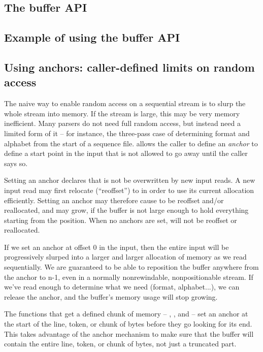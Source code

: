\subsection{The buffer API}


\subsection{Example of using the buffer API}


\subsection{Using anchors: caller-defined limits on random access}

The naive way to enable random access on a sequential stream is to
slurp the whole stream into memory. If the stream is large, this may
be very memory inefficient. Many parsers do not need full random
access, but instead need a limited form of it -- for instance, the
three-pass case of determining format and alphabet from the start of a
sequence file.  allows the caller to define an
\emph{anchor} to define a start point in the input that is not allowed
to go away until the caller says so. 

Setting an anchor declares that  is not be
overwritten by new input reads. A new input read may first relocate
(``reoffset'')  to 
in order to use its current allocation efficiently. Setting an anchor
may therefore cause  to be reoffset and/or reallocated, and
 may grow, if the buffer is not large enough to hold
everything starting from the  position. When no anchors
are set,  will not be reoffset or reallocated.

If we set an anchor at offset 0 in the input, then the entire input
will be progressively slurped into a larger and larger allocation of
memory as we read sequentially. We are guaranteed to be able to
reposition the buffer anywhere from the anchor to n-1, even in a
normally nonrewindable, nonpositionable stream. If we've read enough
to determine what we need (format, alphabet...), we can release the
anchor, and the buffer's memory usage will stop growing.

The functions that get a defined chunk of memory --
, , and
 -- set an anchor at the start of the
line, token, or chunk of bytes before they go looking for its end.
This takes advantage of the anchor mechanism to make sure that the
buffer will contain the entire line, token, or chunk of bytes, not just a
truncated part.





